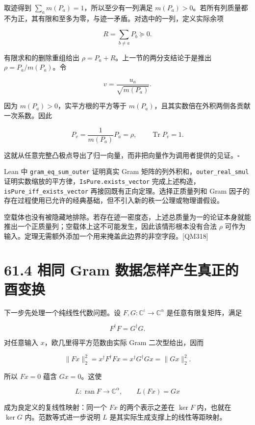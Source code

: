 \documentclass[
  11pt,
  oneside]{book}
\begin{document}
取迹得到 \(\sum_a m(P_a)=1\)，所以至少有一列满足
\(m(P_a)>0\)。若所有列质量都不为正，其有限和至多为零，与迹一矛盾。对选中的一列，定义实际余项

\[
R=\sum_{b\ne a}P_b\succeq0.
\]

有限求和的删除重组给出 \(\rho=P_a+R\)。上一节的两分支结论于是推出
\(\rho=P_a/m(P_a)\)。令

\[
v=\frac{u_a}{\sqrt{m(P_a)}}.
\]

因为 \(m(P_a)>0\)，实平方根的平方等于
\(m(P_a)\)，且其实数倍在外积两侧各贡献一次系数。因此

\[
P_v=\frac1{m(P_a)}P_a=\rho,
\qquad\operatorname{Tr}P_v=1.
\]

这就从任意完整凸极点导出了归一向量，而非把向量作为调用者提供的见证。\(\square\)

Lean 中 \texttt{gram\_\allowbreak eq\_\allowbreak sum\_\allowbreak outer} 证明真实 Gram
矩阵的列外积和，\texttt{outer\_\allowbreak real\_\allowbreak smul}
证明实数缩放的平方律，\texttt{Is\allowbreak Pure.\allowbreak exists\_\allowbreak vector}
完成上述构造，\texttt{is\allowbreak Pure\_\allowbreak iff\_\allowbreak exists\_\allowbreak vector}
再接回既有正向定理。选择正质量列和 Gram
因子的存在过程使用已允许的经典基础，但不引入新的秩一公理或物理谱假设。

空载体也没有被隐藏地排除。若存在迹一密度态，上述总质量为一的论证本身就能推出一个正质量列；空载体上这不可能发生，因此该情形根本没有合法
\(\rho\)
可作为输入。定理无需额外添加一个用来掩盖此边界的非空字段。{[}QM318{]}

\section{61.4 相同 Gram 数据怎样产生真正的酉变换}

下一步先处理一个纯线性代数问题。设
\(F,G:\mathbb C^{\iota}\to\mathbb C^{\alpha}\) 是任意有限复矩阵，满足

\[
F^\dagger F=G^\dagger G.
\]

对任意输入 \(x\)，欧几里得平方范数由实际 Gram 二次型给出，因而

\[
\|Fx\|_2^2=x^\dagger F^\dagger Fx
=x^\dagger G^\dagger Gx=\|Gx\|_2^2.
\]

所以 \(Fx=0\) 蕴含 \(Gx=0\)。这使

\[
L:\operatorname{ran}F\longrightarrow\mathbb C^\alpha,
\qquad L(Fx)=Gx
\]

成为良定义的复线性映射：同一个 \(Fx\) 的两个表示之差在 \(\ker F\)
内，也就在 \(\ker G\) 内。范数等式进一步说明 \(L\)
是其实际生成支撑上的线性等距映射。
\end{document}
